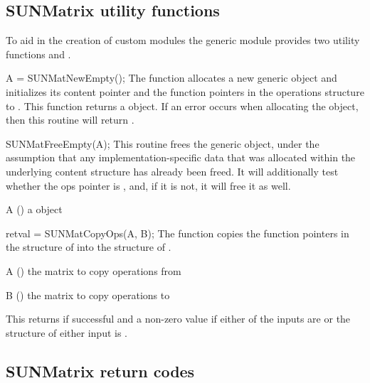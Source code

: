\subsection{SUNMatrix utility functions}\label{ss:sunmatrix_utilities}

To aid in the creation of custom {\sunmatrix} modules the generic {\sunmatrix}
module provides two utility functions  and
.

{
  A = SUNMatNewEmpty();
}
{
  The function  allocates a new generic {\sunmatrix} object
  and initializes its content pointer and the function pointers in the
  operations structure to .
}
{}
{
  This function returns a  object. If an error occurs when
  allocating the object, then this routine will return .
}
{}

{
  SUNMatFreeEmpty(A);
}
{
  This routine frees the generic  object, under the assumption that any
  implementation-specific data that was allocated within the underlying content structure
  has already been freed. It will additionally test whether the ops pointer is , 
  and, if it is not, it will free it as well.
}
{
  \begin{args}[A]
  \item[A] () a  object
  \end{args}
}
{}
{}

{
  retval = SUNMatCopyOps(A, B);
}
{
  The function  copies the function pointers in the 
  structure of  into the  structure of .
}
{
  \begin{args}[A]
  \item[A] () the matrix to copy operations from
  \item[B] () the matrix to copy operations to
  \end{args}
}
{
  This returns  if successful and a non-zero value if either of the inputs
  are  or the  structure of either input is .
}
{}


\subsection{SUNMatrix return codes}\label{ss:sunmatrix_ReturnCodes}

